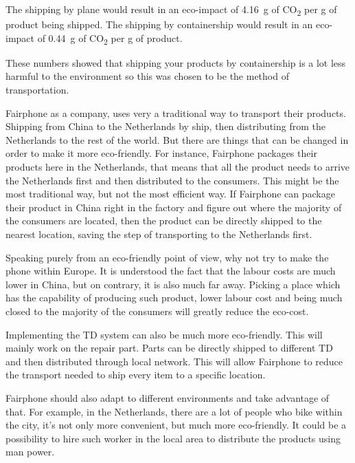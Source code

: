 \documentclass[final]{scrreprt} %
\begin{document}
The shipping by plane would result in an eco-impact of \SI{4.16}{\gram} of CO\textsubscript{2} per g of product being shipped.
The shipping by containership would result in an eco-impact of \SI{0.44}{\gram} of CO\textsubscript{2} per g of product.

These numbers showed that shipping your products by containership is a lot less harmful to the environment so this was chosen to be the method of transportation.

Fairphone as a company, uses very a traditional way to transport their products. Shipping from China to the Netherlands by ship, then distributing from the Netherlands to the rest of the world. But there are things that can be changed in order to make it more eco-friendly. For instance, Fairphone packages their products here in the Netherlands, that means that all the product needs to arrive the Netherlands first and then distributed to the consumers. This might be the most traditional way, but not the most efficient way. If Fairphone can package their product in China right in the factory and figure out where the majority of the consumers are located, then the product can be directly shipped to the nearest location, saving the step of transporting to the Netherlands first. 

Speaking purely from an eco-friendly point of view, why not try to make the phone within Europe. It is understood the fact that the labour costs are much lower in China, but on contrary, it is also much far away. Picking a place which has the capability of producing such product, lower labour cost and being much closed to the majority of the consumers will greatly reduce the eco-cost. 

Implementing the TD system can also be much more eco-friendly. This will mainly work on the repair part. Parts can be directly shipped to different TD and then distributed through local network. This will allow Fairphone to reduce the transport needed to ship every item to a specific location. 

Fairphone should also adapt to different environments and take advantage of that. For example, in the Netherlands, there are a lot of people who bike within the city, it’s not only more convenient, but much more eco-friendly. It could be a possibility to hire such worker in the local area to distribute the products using man power. 
\end{document}
